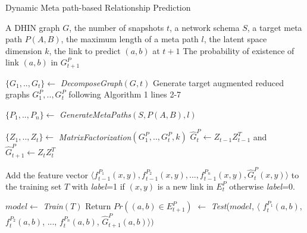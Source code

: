 \begin{algorithm}[t]
\caption{Dynamic Meta path-based Relationship Prediction}\label{alg2}
\begin{algorithmic}[1]%
\REQUIRE A DHIN graph $G$, the number of snapshots $t$, a network schema $S$, a target meta path $P(A,B)$, the maximum length of a meta path $l$, the latent space dimension $k$, the link to predict $(a,b)$ at $t+1$
\ENSURE The probability of existence of link $(a,b)$ in $G^P_{t+1}$

\STATE $\{G_1, .., G_t\} \leftarrow$ \textit{DecomposeGraph}$(G, t)$
\STATE  Generate target augmented reduced graphs $G^P_1, .., G^P_t$ following Algorithm 1 lines 2-7

\STATE $\{P_1, .., P_n\} \leftarrow$ \textit{GenerateMetaPaths}$(S, P(A,B), l)$

%
%



\STATE $\{Z_1, .., Z_t\} \leftarrow$ \textit{MatrixFactorization}$(G^{P}_1, .., G^{P}_t, k)$
\STATE $\hat{G}^{P}_{t} \leftarrow Z_{t-1}Z^T_{t-1}$ and  $\hat{G}^{P}_{t+1} \leftarrow Z_tZ^T_t$



\STATE Add the feature vector $\langle f^{P_1}_{t-1}(x,y), f^{P_2}_{t-1}(x,y), ..., f^{P_n}_{t-1}(x,y), \hat{G}^{P}_{t}(x,y)\rangle$ to the training set $T$ with \textit{label}=1 if $(x,y)$ is a new link in $E^{P}_{t}$ otherwise \textit{label}=0.

\ENDFOR



\STATE $model \leftarrow$ \textit{Train}$(T)$
\STATE Return $Pr((a,b)\in E^P_{t+1})$ $\leftarrow$ \textit{Test}($model$, $\langle$ $f^{P_1}_{t}(a,b)$, $f^{P_2}_{t}(a,b)$, ..., $f^{P_n}_{t}(a,b)$, $\hat{G}^{P}_{t+1}(a,b)\rangle)$

\end{algorithmic}
\end{algorithm}

